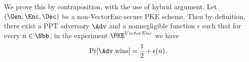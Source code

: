 \begin{answer}[ii]
    We prove this by contraposition, with the use of hybrid argument.   Let $(\Gen, \Enc, \Dec)$ be a non-VectorEnc-secure PKE scheme. Then by definition, there exist a PPT adversary $\Adv$ and a nonnegligible function $\epsilon$ such that for every $n\in\Nbb$, in the experiment $\PKE^{VectorEnc}$ we have
    \begin{equation}\label{eq:p3-2-2}
        \Pr[\Adv \textrm{ wins}] =\frac{1}{2}+\epsilon(n).
    \end{equation}
    

\end{answer}
